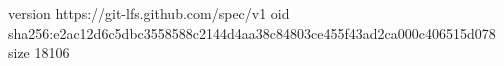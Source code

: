 version https://git-lfs.github.com/spec/v1
oid sha256:e2ac12d6c5dbc3558588c2144d4aa38c84803ce455f43ad2ca000c406515d078
size 18106
